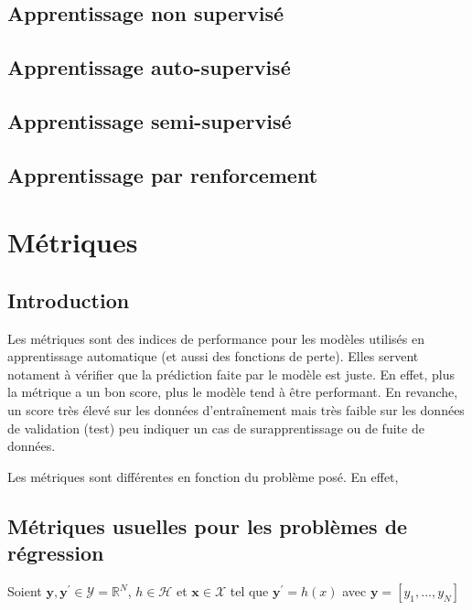\section{Apprentissage non supervisé}

\section{Apprentissage auto-supervisé}

\section{Apprentissage semi-supervisé}

\section{Apprentissage par renforcement}

\chapter{Métriques}
\section{Introduction}

\noindent Les métriques sont des indices de performance pour les modèles utilisés en apprentissage automatique (et aussi des fonctions de perte). Elles servent notament à vérifier que la prédiction faite par le modèle est juste. En effet, 
plus la métrique a un bon score, plus le modèle tend à être performant. En revanche, un score très élevé sur les données d'entraînement mais très faible sur les données de validation (test) peu indiquer 
un cas de surapprentissage ou de fuite de données. \newline

\noindent Les métriques sont différentes en fonction du problème posé. En effet,  

\section{Métriques usuelles pour les problèmes de régression}

Soient $\boldsymbol{y}, \boldsymbol{y}^{'} \in \mathcal{Y} = \mathbb{R}^{N}$, $h \in \mathcal{H}$ et $\boldsymbol{x} \in \mathcal{X}$ tel que $\boldsymbol{y}^{'} = h(x)$ avec $\boldsymbol{y} = [y_1, \dots, y_N]$

